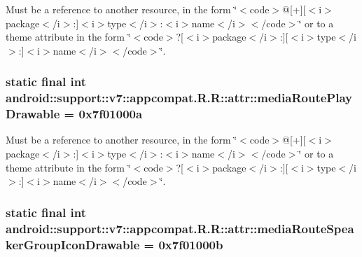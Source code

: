 Must be a reference to another resource, in the form \char`\"{}$<$code$>$@\mbox{[}+\mbox{]}\mbox{[}$<$i$>$package$<$/i$>$:\mbox{]}$<$i$>$type$<$/i$>$:$<$i$>$name$<$/i$>$$<$/code$>$\char`\"{} or to a theme attribute in the form \char`\"{}$<$code$>$?\mbox{[}$<$i$>$package$<$/i$>$:\mbox{]}\mbox{[}$<$i$>$type$<$/i$>$:\mbox{]}$<$i$>$name$<$/i$>$$<$/code$>$\char`\"{}. \hypertarget{classandroid_1_1support_1_1v7_1_1appcompat_1_1_r_1_1attr_980b7b80c3b5fee0d605c7ddb10171cb}{
\subsubsection[{mediaRoutePlayDrawable}]{\setlength{\rightskip}{0pt plus 5cm}static final int android::support::v7::appcompat.R.R::attr::mediaRoutePlayDrawable = 0x7f01000a}}
\label{classandroid_1_1support_1_1v7_1_1appcompat_1_1_r_1_1attr_980b7b80c3b5fee0d605c7ddb10171cb}


Must be a reference to another resource, in the form \char`\"{}$<$code$>$@\mbox{[}+\mbox{]}\mbox{[}$<$i$>$package$<$/i$>$:\mbox{]}$<$i$>$type$<$/i$>$:$<$i$>$name$<$/i$>$$<$/code$>$\char`\"{} or to a theme attribute in the form \char`\"{}$<$code$>$?\mbox{[}$<$i$>$package$<$/i$>$:\mbox{]}\mbox{[}$<$i$>$type$<$/i$>$:\mbox{]}$<$i$>$name$<$/i$>$$<$/code$>$\char`\"{}. \hypertarget{classandroid_1_1support_1_1v7_1_1appcompat_1_1_r_1_1attr_7dc76c7459b3caf5a6591678e7ee5a7c}{
\subsubsection[{mediaRouteSpeakerGroupIconDrawable}]{\setlength{\rightskip}{0pt plus 5cm}static final int android::support::v7::appcompat.R.R::attr::mediaRouteSpeakerGroupIconDrawable = 0x7f01000b}}
\label{classandroid_1_1support_1_1v7_1_1appcompat_1_1_r_1_1attr_7dc76c7459b3caf5a6591678e7ee5a7c}


